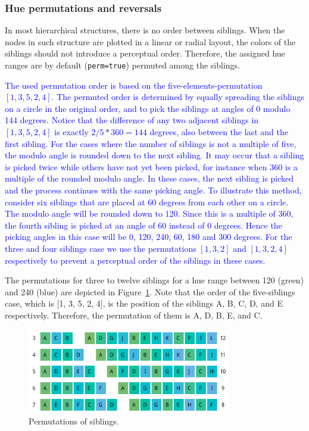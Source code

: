 \documentclass[review,journal]{vgtc}         %
\newcommand{\changedM}[1]{\textcolor{blue}{#1}}
\begin{document}
\subsubsection{Hue permutations and reversals}

In most hierarchical structures, there is no order between siblings. 
When the nodes in such structure are plotted in a linear or radial layout, 
the colors of the siblings should not introduce a perceptual order. Therefore, the assigned hue 
ranges are by default (\texttt{perm=true}) permuted among the siblings. 


\changedM{The used permutation order is based on the five-elements-permutation $[1, 3, 5, 2, 4]$. The permuted order is determined by equally spreading the siblings on a circle in the original order, and to pick the siblings at angles of 0 modulo 144 degrees. Notice that the difference of any two adjacent siblings in $[1, 3, 5, 2, 4]$ is exactly $2/5 * 360=144$ degrees, also between the last and the first sibling. For the cases where the number of siblings is not a multiple of five, the modulo angle is rounded down to the next sibling. It may occur that a sibling is picked twice while others have not yet been picked, for instance when 360 is a multiple of the rounded modulo angle. In these cases, the next sibling is picked and the process continues with the same picking angle. To illustrate this method, consider six siblings that are placed at 60 degrees from each other on a circle. The modulo angle will be rounded down to 120. Since this is a multiple of 360, the fourth sibling is picked at an angle of 60 instead of 0 degrees. Hence the picking angles in this case will be 0, 120, 240, 60, 180 and 300 degrees. For the three and four siblings case we use the permutations $[1, 3, 2]$ and $[1, 3, 2, 4]$ respectively to prevent a perceptual order of the siblings in these cases.}



The permutations for three to twelve siblings for a hue range between 120 (green) and 240 (blue) are depicted in Figure~\ref{fig:perm}. Note that the order of the five-siblings case, which is [1, 3, 5, 2, 4], is the position of the siblings A, B, C, D, and E respectively. Therefore, the permutation of them is A, D, B, E, and C. 

\begin{figure}[tb]
  \centering
  \includegraphics[width=3.5in]{Permutations.pdf}
  \caption{Permutations of siblings.}\label{fig:perm}
\end{figure}
\end{document}
